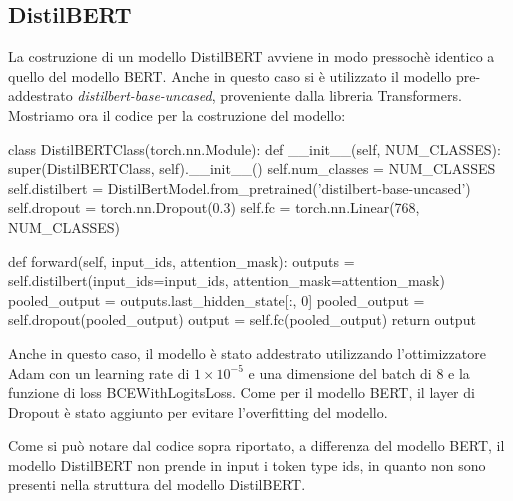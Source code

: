 \documentclass[../../Thesis.tex]{subfiles}
\begin{document}
\subsection{DistilBERT}
La costruzione di un modello DistilBERT avviene in modo pressochè identico a quello del modello BERT. Anche in questo caso si è utilizzato il modello pre-addestrato \textit{distilbert-base-uncased}, proveniente dalla libreria Transformers. Mostriamo ora il codice per la costruzione del modello:
\begin{python}
    class DistilBERTClass(torch.nn.Module):
    def __init__(self, NUM_CLASSES):
        super(DistilBERTClass, self).__init__()
        self.num_classes = NUM_CLASSES
        self.distilbert = DistilBertModel.from_pretrained('distilbert-base-uncased')
        self.dropout = torch.nn.Dropout(0.3)
        self.fc = torch.nn.Linear(768, NUM_CLASSES)
    
    def forward(self, input_ids, attention_mask):
        outputs = self.distilbert(input_ids=input_ids, attention_mask=attention_mask)
        pooled_output = outputs.last_hidden_state[:, 0]
        pooled_output = self.dropout(pooled_output)
        output = self.fc(pooled_output)
        return output
\end{python}
Anche in questo caso, il modello è stato addestrato utilizzando l'ottimizzatore Adam con un learning rate di $1 \times 10^{-5}$ e una dimensione del batch di 8 e la funzione di loss BCEWithLogitsLoss. Come per il modello BERT, il layer di Dropout è stato aggiunto per evitare l'overfitting del modello.

Come si può notare dal codice sopra riportato, a differenza del modello BERT, il modello DistilBERT non prende in input i token type ids, in quanto non sono presenti nella struttura del modello DistilBERT.
\end{document}
